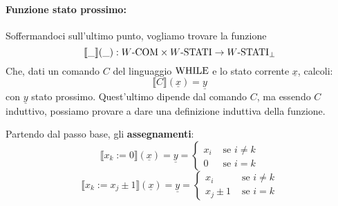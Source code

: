 \paragraph{Funzione stato prossimo:} Soffermandoci sull'ultimo punto, vogliamo trovare la funzione
$$  \llbracket \_ \rrbracket ( \_ ): W\text{-COM} \times W\text{-STATI} \rightarrow W\text{-STATI}_\bot $$
Che, dati un comando $C$ del linguaggio $\text{WHILE}$ e lo stato corrente $\underline{x}$, calcoli:
$$ \llbracket C \rrbracket (\underline{x}) = \underline{y} $$
con $\underline{y}$ stato prossimo. Quest'ultimo dipende dal comando $C$, ma essendo $C$ induttivo, possiamo provare a dare una definizione induttiva della funzione.

Partendo dal passo base, gli \textbf{assegnamenti}:
$$
\llbracket x_k := 0 \rrbracket (\underline{x}) = \underline{y} = \begin{cases}
	x_i & \text{ se } i \neq k \\
	0 & \text{ se } i = k
\end{cases}
$$
$$ 
\llbracket x_k := x_j \pm 1 \rrbracket (\underline{x}) = \underline{y} = \begin{cases}
	x_i & \text{ se } i \neq k \\
	x_j \pm 1 & \text{ se } i = k
\end{cases}
$$

